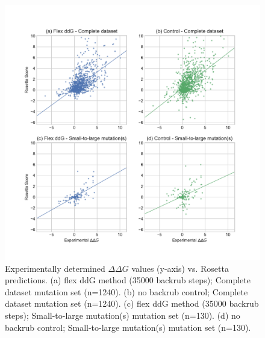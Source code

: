\begin{figure}
  \includegraphics[width=\textwidth,keepaspectratio]{fig-scatter.pdf}
  \caption[]{ %
    Experimentally determined $\Delta\Delta G$ values (y-axis) vs. Rosetta predictions.
    (a) flex ddG method (35000 backrub steps); Complete dataset mutation set (n=1240).
    (b) no backrub control; Complete dataset mutation set (n=1240).
    (c) flex ddG method (35000 backrub steps); Small-to-large mutation(s) mutation set (n=130).
    (d) no backrub control; Small-to-large mutation(s) mutation set (n=130).
  } \label{fig:figure-scatter}
\end{figure}
